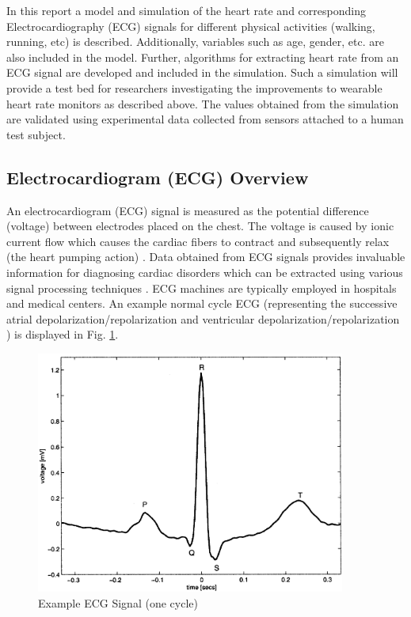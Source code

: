 \documentclass[paper=a4, fontsize=11pt]{scrartcl}
\numberwithin{equation}{section}		%
\numberwithin{figure}{section}			%
\numberwithin{table}{section}		    %
\begin{document}
In this report a model and simulation of the heart rate and corresponding Electrocardiography (ECG) \cite{pai2014Electrocardiogram} signals for different physical activities (walking, running, etc) is
described. Additionally, variables such as age, gender, etc. are also included in the model. Further, 
algorithms for extracting heart rate from an ECG signal are developed and included in the simulation.
Such a simulation will provide a test bed for researchers investigating the improvements to wearable
heart rate monitors as described above. The values obtained from the simulation are validated using 
experimental data collected from sensors attached to a human test subject.  

\subsection{Electrocardiogram (ECG) Overview}
An electrocardiogram (ECG) signal is measured as the potential difference (voltage) between  
electrodes placed on the chest. The voltage is caused by ionic current flow which causes the cardiac 
fibers to contract and subsequently relax (the heart pumping action) \cite{mcsharry2003dynamical}. 
Data obtained from ECG signals provides invaluable information for diagnosing cardiac disorders 
which can be extracted using various signal processing techniques \cite{smith2002heart}. ECG 
machines are typically employed in hospitals and medical centers. An example normal cycle ECG 
(representing the successive atrial depolarization/repolarization and ventricular 
depolarization/repolarization \cite{mcsharry2003dynamical}) is displayed in Fig. \ref{fig:ecg}.\\

\begin{figure}[H]
	\begin{center} 
		\includegraphics[height=3.14in,width=4in]{mcsharry2003dynamical_ecg} 
		\caption{Example ECG Signal (one cycle) \cite{mcsharry2003dynamical}\label{fig:ecg}} 
	\end{center} 
\end{figure}
\end{document}
